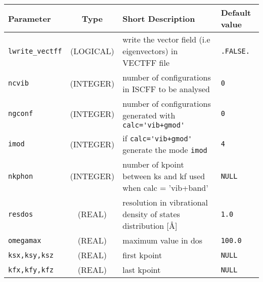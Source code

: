 \documentclass[a4paper,8pt]{article}
\begin{document}
\begin{longtable}{l|c|m{8cm}|m{2cm}}
\hline
\hline
Parameter        &  Type              &          Short Description                                                          & Default value \\
\hline
\hline
\rule[-0.75cm]{0cm}{1.5cm}
\verb?lwrite_vectff? 
                 & (LOGICAL)          & write the vector field (i.e eigenvectors) in VECTFF file                            & \verb?.FALSE.?  \\
\hline
\rule[-0.75cm]{0cm}{1.5cm}
\verb?ncvib?     & (INTEGER)          & number of configurations in ISCFF to be analysed                                    & \verb?0? \\
\hline
\rule[-0.75cm]{0cm}{1.5cm}
\verb?ngconf?    & (INTEGER)          & number of configurations generated with \verb?calc='vib+gmod'?                      & \verb?0? \\
\hline
\rule[-0.75cm]{0cm}{1.5cm}
\verb?imod?      & (INTEGER)          & if \verb?calc='vib+gmod'? generate the mode \verb?imod?                             & \verb?4? \\
\hline
\rule[-0.75cm]{0cm}{1.5cm}
\verb?nkphon?    & (INTEGER)          & number of kpoint between ks and kf used when calc = 'vib+band'                      & \verb?NULL? \\
\hline
\rule[-0.75cm]{0cm}{1.5cm}
\verb?resdos?    & (REAL)             & resolution in vibrational density of states distribution [\AA]                      & \verb?1.0? \\
\hline
\rule[-0.75cm]{0cm}{1.5cm}
\verb?omegamax?  & (REAL)             & maximum value in dos                                                                & \verb?100.0? \\
\hline
\rule[-0.75cm]{0cm}{1.5cm}
\verb?ksx,ksy,ksz?  
                 & (REAL)             & first kpoint                                                                        & \verb?NULL? \\
\hline
\rule[-0.75cm]{0cm}{1.5cm}
\verb?kfx,kfy,kfz?  
                 & (REAL)             & last kpoint                                                                         & \verb?NULL? \\
\hline
\hline
\end{longtable}

\end{document}
